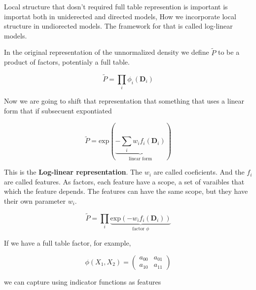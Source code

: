 %         
%         
%         


Local structure that dosn't required full table represention is important is importat both in uniderected and directed models,
How we incorporate local structure in undiorected models.
The framework for that is called log-linear models.

\vspace{0.3cm}

In the original representation of the unnormalized density we define $\tilde{P}$ to be a product of factors, potentialy a full table.

\begin{equation}
 \tilde{P} = \prod_i \phi_i(\bm{D}_i)
\end{equation}

Now we are going to shift that representation that something that uses a linear form that if subsecuent expontiated

\begin{equation}\label{eq:logLinearRepresentation}
 \tilde{P} = \text{exp}(\underbrace{-\sum_i w_i f_i(\bm{D}_i)}_{\text{linear form}})
\end{equation}

This is the \textbf{Log-linear representation}.
The $w_i$ are called coeficients. 
And the $f_i$ are called features.
As factors, each feature have a scope, a set of varaibles that which the feature depends.
The features can have the same scope, but they have their own parameter $w_i$.

\begin{equation}
 \tilde{P} = \prod_i \underbrace{\text{exp}(- w_i f_i(\bm{D}_i))}_{\text{factor $\phi$}}
\end{equation}

If we have a full table factor, for example,

\begin{equation}
 \phi(X_1,X_2) = \begin{pmatrix}
 a_{00} & a_{01} \\
a_{10} & a_{11}
\end{pmatrix}
\end{equation}

we can capture using indicator functions as features

